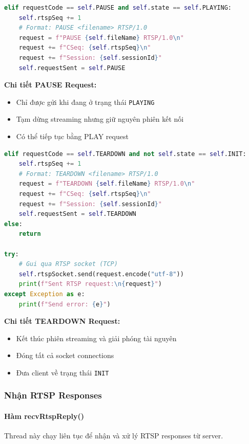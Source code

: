 \begin{lstlisting}[language=Python, caption={PAUSE Request}]
elif requestCode == self.PAUSE and self.state == self.PLAYING:
    self.rtspSeq += 1
    # Format: PAUSE <filename> RTSP/1.0
    request = f"PAUSE {self.fileName} RTSP/1.0\n"
    request += f"CSeq: {self.rtspSeq}\n"
    request += f"Session: {self.sessionId}"
    self.requestSent = self.PAUSE
\end{lstlisting}

\textbf{Chi tiết PAUSE Request:}
\begin{itemize}
    \item Chỉ được gửi khi đang ở trạng thái \texttt{PLAYING}
    \item Tạm dừng streaming nhưng giữ nguyên phiên kết nối
    \item Có thể tiếp tục bằng PLAY request
\end{itemize}

\begin{lstlisting}[language=Python, caption={TEARDOWN Request \& Sending}]
elif requestCode == self.TEARDOWN and not self.state == self.INIT:
    self.rtspSeq += 1
    # Format: TEARDOWN <filename> RTSP/1.0
    request = f"TEARDOWN {self.fileName} RTSP/1.0\n"
    request += f"CSeq: {self.rtspSeq}\n"
    request += f"Session: {self.sessionId}"
    self.requestSent = self.TEARDOWN
else:
    return

try:
    # Gui qua RTSP socket (TCP)
    self.rtspSocket.send(request.encode("utf-8"))
    print(f"Sent RTSP request:\n{request}")
except Exception as e:
    print(f"Send error: {e}")
\end{lstlisting}

\textbf{Chi tiết TEARDOWN Request:}
\begin{itemize}
    \item Kết thúc phiên streaming và giải phóng tài nguyên
    \item Đóng tất cả socket connections
    \item Đưa client về trạng thái \texttt{INIT}
\end{itemize}

\subsubsection{Nhận RTSP Responses}

\paragraph{Hàm recvRtspReply()}
Thread này chạy liên tục để nhận và xử lý RTSP responses từ server.

